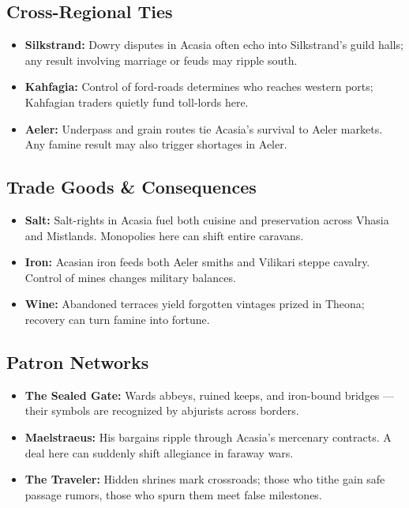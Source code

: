 \subsection*{Cross-Regional Ties}
\begin{itemize}
  \item \textbf{Silkstrand:} Dowry disputes in Acasia often echo into Silkstrand’s guild halls; any result involving marriage or feuds may ripple south.
  \item \textbf{Kahfagia:} Control of ford-roads determines who reaches western ports; Kahfagian traders quietly fund toll-lords here.
  \item \textbf{Aeler:} Underpass and grain routes tie Acasia’s survival to Aeler markets. Any famine result may also trigger shortages in Aeler.
\end{itemize}

\subsection*{Trade Goods \& Consequences}
\begin{itemize}
  \item \textbf{Salt:} Salt-rights in Acasia fuel both cuisine and preservation across Vhasia and Mistlands. Monopolies here can shift entire caravans.
  \item \textbf{Iron:} Acasian iron feeds both Aeler smiths and Vilikari steppe cavalry. Control of mines changes military balances.
  \item \textbf{Wine:} Abandoned terraces yield forgotten vintages prized in Theona; recovery can turn famine into fortune.
\end{itemize}

\subsection*{Patron Networks}
\begin{itemize}
  \item \textbf{The Sealed Gate:} Wards abbeys, ruined keeps, and iron-bound bridges — their symbols are recognized by abjurists across borders.
  \item \textbf{Maelstraeus:} His bargains ripple through Acasia’s mercenary contracts. A deal here can suddenly shift allegiance in faraway wars.
  \item \textbf{The Traveler:} Hidden shrines mark crossroads; those who tithe gain safe passage rumors, those who spurn them meet false milestones.
\end{itemize}

